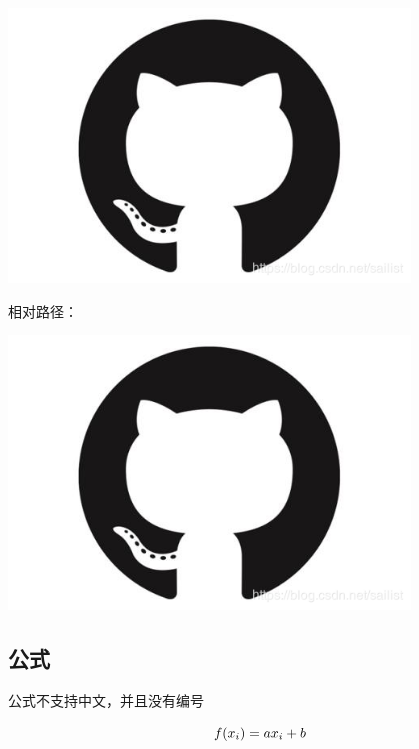 \documentclass{article}
\begin{document}
\begin{center}
\vspace{\baselineskip}\includegraphics[width=0.8\textwidth]{images/1c59f8ef2aa3c5e527a22b7c258489d6.png}\vspace{\baselineskip}
\end{center}


相对路径：
\begin{center}
\vspace{\baselineskip}\includegraphics[width=0.8\textwidth]{images/ef84f157872e22d7cffcae03a00ea530.png}\vspace{\baselineskip}
\end{center}


\subsection{公式}


公式不支持中文，并且没有编号


\[
\\ f(x_i)=ax_i+b\\ \\
\]
\end{document}
